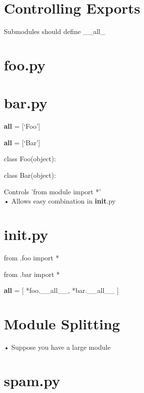 \documentclass[
  letterpaper,
  DIV=11,
  numbers=noendperiod]{scrreprt}
\begin{document}
\chapter{Controlling Exports}\label{controlling-exports}

Submodules should define \_\_all\_


\chapter{foo.py}\label{foo.py-1}


\chapter{bar.py}\label{bar.py-3}

\textbf{all} = {[}`Foo'{]}

\textbf{all} = {[}`Bar'{]}

class Foo(object):

class Bar(object):

Controls 'from module import *'\\
• Allows easy combination in \textbf{init}.py


\chapter{\texorpdfstring{\textbf{init}.py}{init.py}}\label{init.py}

from .foo import *

from .bar import *

\textbf{all} = {[} *foo.\_\_all\_\_, *bar.\_\_all\_\_ {]}


\chapter{Module Splitting}\label{module-splitting}

• Suppose you have a large module


\chapter{spam.py}\label{spam.py}
\end{document}
